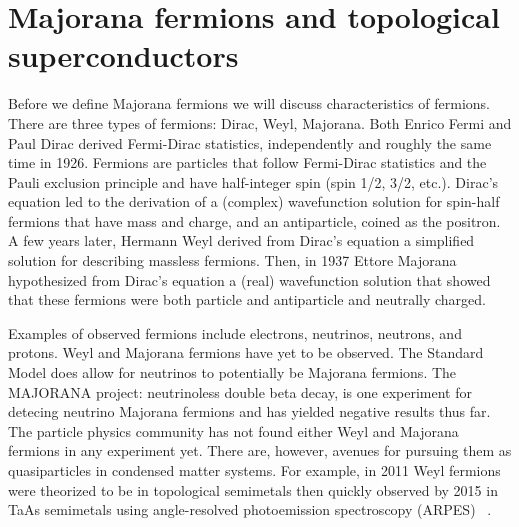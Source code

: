 \section{Majorana fermions and topological superconductors}

Before we define Majorana fermions we will discuss characteristics of fermions.
There are three types of fermions: Dirac, Weyl, Majorana.
Both Enrico Fermi and Paul Dirac derived Fermi-Dirac statistics, independently and roughly the same time in 1926.
Fermions are particles that follow Fermi-Dirac statistics and the Pauli exclusion principle and have half-integer spin (spin 1/2, 3/2, etc.).
Dirac's equation led to the derivation of a (complex) wavefunction solution for spin-half fermions that have mass and charge, and an antiparticle, coined as the positron.
A few years later, Hermann Weyl derived from Dirac's equation a simplified solution for describing massless fermions.
Then, in 1937 Ettore Majorana hypothesized from Dirac's equation a (real) wavefunction solution that showed that these fermions were both particle and antiparticle and neutrally charged.

Examples of observed fermions include electrons, neutrinos, neutrons, and protons.
Weyl and Majorana fermions have yet to be observed.
The Standard Model does allow for neutrinos to potentially be Majorana fermions.
The MAJORANA project: neutrinoless double beta decay, is one experiment for detecing neutrino Majorana fermions and has yielded negative results thus far.
The particle physics community has not found either Weyl and Majorana fermions in any experiment yet.
There are, however, avenues for pursuing them as quasiparticles in condensed matter systems.
For example, in 2011 Weyl fermions were theorized to be in topological semimetals then quickly observed by 2015 in TaAs semimetals using angle-resolved photoemission spectroscopy (ARPES)  ~\cite{wanTopologicalSemimetalFermiarc2011, xuDiscoveryWeylFermion2015, liWeylSemimetalTaAs2016}.

